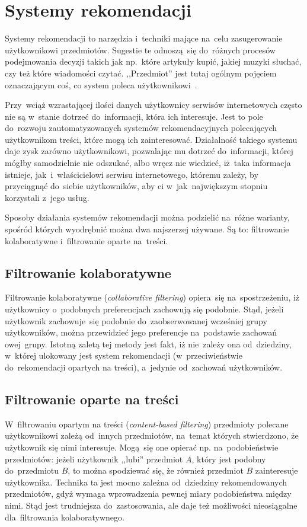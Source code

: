 \documentclass[pl]{minipw} %
\begin{document}
\section{Systemy rekomendacji}

Systemy rekomendacji to narzędzia i~techniki mające na~celu zasugerowanie użytkownikowi przedmiotów. Sugestie te odnoszą~się do~różnych procesów podejmowania decyzji takich jak np.~które artykuły kupić, jakiej muzyki słuchać, czy też które wiadomości czytać. ,,Przedmiot'' jest tutaj ogólnym pojęciem oznaczającym coś, co system poleca użytkownikowi~\cite{handbook}. 

Przy~wciąż wzrastającej ilości danych użytkownicy serwisów internetowych często nie są w~stanie dotrzeć do~informacji, która ich interesuje. Jest to pole do~rozwoju zautomatyzowanych systemów rekomendacyjnych polecających użytkownikom treści, które mogą ich zainteresować. Działalność takiego systemu daje zysk zarówno użytkownikowi, pozwalając mu dotrzeć do~informacji, której mógłby samodzielnie nie odszukać, albo wręcz nie wiedzieć, iż~taka informacja istnieje, jak~i~właścicielowi serwisu internetowego, któremu zależy, by przyciągnąć do~siebie użytkowników, aby ci w~jak~największym stopniu korzystali z~jego usług.

Sposoby działania systemów rekomendacji można podzielić na~różne warianty, spośród których wyodrębnić można dwa najszerzej używane. Są to: filtrowanie kolaboratywne i~filtrowanie oparte na~treści.

\subsection{Filtrowanie kolaboratywne}
Filtrowanie kolaboratywne (\textit{collaborative filtering}) opiera~się na~spostrzeżeniu, iż użytkownicy o~podobnych preferencjach zachowują się podobnie. Stąd, jeżeli użytkownik zachowuje~się podobnie do~zaobserwowanej wcześniej grupy użytkowników, można przewidzieć jego preferencje na~podstawie zachowań owej~grupy. Istotną zaletą tej metody jest fakt, iż nie~zależy ona od~dziedziny, w~której ulokowany jest system rekomendacji (w~przeciwieństwie do~rekomendacji opartych na treści), a~jedynie od~zachowań użytkowników.
\subsection{Filtrowanie oparte na treści}
W~filtrowaniu opartym na treści (\textit{content-based filtering}) przedmioty polecane użytkownikowi zależą od~innych przedmiotów, na~temat których stwierdzono, że użytkownik się nimi interesuje. Mogą~się one opierać np. na~podobieństwie przedmiotów: jeżeli użytkownik ,,lubi'' przedmiot $A$, który jest podobny do~przedmiotu $B$, to można spodziewać się, że również przedmiot $B$ zainteresuje użytkownika. Technika ta jest mocno zależna od~dziedziny rekomendowanych przedmiotów, gdyż wymaga wprowadzenia pewnej miary podobieństwa między nimi. Stąd jest trudniejsza do~zastosowania, ale daje też możliwości nieosiągalne dla~filtrowania kolaboratywnego.
\end{document}
